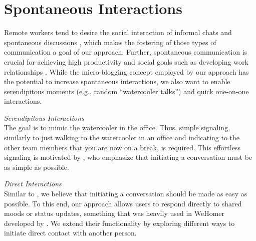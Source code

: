 \section{Spontaneous Interactions}
Remote workers tend to desire the social interaction of informal chats and spontaneous discussions \autocite{cooper2002telecommuting}, which makes the fostering of those types of communication a goal of our approach. Further, spontaneous communication is crucial for achieving high productivity and social goals \autocite{kraut1990informal} such as developing work relationships \autocite{comella2020revisiting, olson2006bridging}. While the micro-blogging concept employed by our approach has the potential to increase spontaneous interactions, we also want to enable serendipitous moments (e.g., random \enquote{watercooler talks}) and quick one-on-one interactions. 

\medskip\noindent\textit{Serendipitous Interactions} \\
The goal is to mimic the watercooler in the office. Thus, simple signaling, similarly to just walking to the watercooler in an office and indicating to the other team members that you are now on a break, is required. This effortless signaling is motivated by \textcite{chang2007out}, who emphasize that initiating a conversation must be as simple as possible. 

\medskip\noindent\textit{Direct Interactions} \\
Similar to \textcite{chang2007out}, we believe that initiating a conversation should be made as easy as possible. To this end, our approach allows users to respond directly to shared moods or status updates, something that was heavily used in WeHomer developed by \textcite{dullemond2013fixing}. We extend their functionality by exploring different ways to initiate direct contact with another person. 

